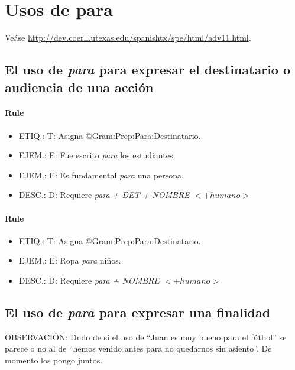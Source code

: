 \documentclass[11pt]{report}
\begin{document}
\section{Usos de para}
Veáse \url{http://dev.coerll.utexas.edu/spanishtx/spe/html/adv11.html}.

\subsection{El uso de \emph{para} para expresar el destinatario o audiencia de una acción}
\paragraph*{Rule}
\begin{itemize}
\item ETIQ.:  T: Asigna @Gram:Prep:Para:Destinatario.
\item EJEM.:  E: Fue escrito \emph{para} los estudiantes.
\item EJEM.:  E: Es fundamental \emph{para} una persona.
\item DESC.:  D: Requiere \emph{para + DET + NOMBRE $<+humano>$}
\end{itemize}

\paragraph*{Rule}
\begin{itemize}
\item ETIQ.:  T: Asigna @Gram:Prep:Para:Destinatario.
\item EJEM.:  E: Ropa \emph{para} niños.
\item DESC.:  D: Requiere \emph{para + NOMBRE $<+humano>$}
\end{itemize}

\subsection{El uso de \emph{para} para expresar una finalidad}
OBSERVACIÓN: Dudo de si el uso de ``Juan es muy bueno para el fútbol'' se parece o no al de ``hemos venido antes para no quedarnos sin asiento''. De momento los pongo juntos.
\end{document}
